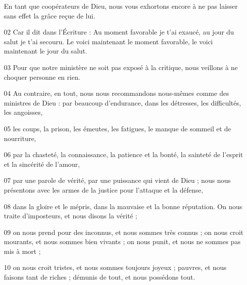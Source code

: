 En tant que coopérateurs de Dieu, nous vous exhortons encore à ne pas laisser sans effet la grâce reçue de lui.

02 Car il dit dans l’Écriture : Au moment favorable je t’ai exaucé, au jour du salut je t’ai secouru. Le voici maintenant le moment favorable, le voici maintenant le jour du salut.

03 Pour que notre ministère ne soit pas exposé à la critique, nous veillons à ne choquer personne en rien.

04 Au contraire, en tout, nous nous recommandons nous-mêmes comme des ministres de Dieu : par beaucoup d’endurance, dans les détresses, les difficultés, les angoisses,

05 les coups, la prison, les émeutes, les fatigues, le manque de sommeil et de nourriture,

06 par la chasteté, la connaissance, la patience et la bonté, la sainteté de l’esprit et la sincérité de l’amour,

07 par une parole de vérité, par une puissance qui vient de Dieu ; nous nous présentons avec les armes de la justice pour l’attaque et la défense,

08 dans la gloire et le mépris, dans la mauvaise et la bonne réputation. On nous traite d’imposteurs, et nous disons la vérité ;

09 on nous prend pour des inconnus, et nous sommes très connus ; on nous croit mourants, et nous sommes bien vivants ; on nous punit, et nous ne sommes pas mis à mort ;

10 on nous croit tristes, et nous sommes toujours joyeux ; pauvres, et nous faisons tant de riches ; démunis de tout, et nous possédons tout.